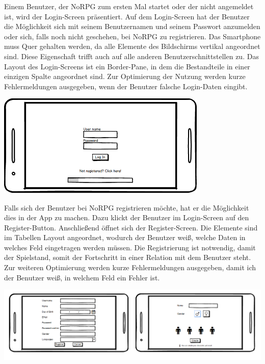 			Einem Benutzer, der NoRPG zum ersten Mal startet oder der nicht angemeldet ist, wird der Login-Screen präsentiert. Auf dem Login-Screen hat der Benutzer die Möglichkeit sich mit seinem Benutzernamen und seinem Passwort anzumelden oder sich, falls noch nicht geschehen, bei NoRPG zu registrieren. Das Smartphone muss Quer gehalten werden, da alle Elemente des Bildschirms vertikal angeordnet sind. Diese Eigenschaft trifft auch auf alle anderen Benutzerschnittstellen zu. Das Layout des Login-Screens ist ein Border-Pane, in dem die Bestandteile in einer einzigen Spalte angeordnet sind. Zur Optimierung der Nutzung werden kurze Fehlermeldungen ausgegeben, wenn der Benutzer falsche Login-Daten eingibt.
			\begin{center}
				\includegraphics[width=10cm]{pics/Login.png}
			\end{center}
			
			Falls sich der Benutzer bei NoRPG registrieren möchte, hat er die Möglichkeit dies in der App zu machen. Dazu klickt der Benutzer im Login-Screen auf den Register-Button. Anschließend öffnet sich der Register-Screen. Die Elemente sind im Tabellen Layout angeordnet, wodurch der Benutzer weiß, welche Daten in welches Feld eingetragen werden müssen. Die Registrierung ist notwendig, damit der Spielstand, somit der Fortschritt in einer Relation mit dem Benutzer steht. Zur weiteren Optimierung werden kurze Fehlermeldungen ausgegeben, damit ich der Benutzer weiß, in welchem Feld ein Fehler ist.
			
			\begin{center}
				\includegraphics[width=\textwidth]{pics/Registerprozess.png}
			\end{center}
			
